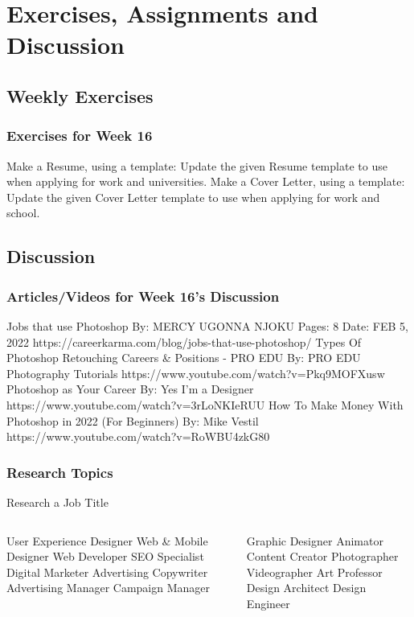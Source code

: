 \documentclass{beamer}
\begin{document}
\section{Exercises, Assignments and Discussion}

\subsection{Weekly Exercises}		
\begin{frame}
	\frametitle{Exercises for Week 16}
	\begin{outline}
		\1 Make a Resume, using a template:
		\2 Update the given Resume template to use when applying for work and universities.
		\1 Make a Cover Letter, using a template:
		\2 Update the given Cover Letter template to use when applying for work and school.
	\end{outline}
\end{frame}

\subsection{Discussion}		
\begin{frame}
	\frametitle{Articles/Videos for Week 16's Discussion}
	\begin{outline}
		\1 Jobs that use Photoshop
		\2  By:    MERCY UGONNA NJOKU
		\2  Pages: 8
		\2  Date:  FEB 5, 2022
		\2 https://careerkarma.com/blog/jobs-that-use-photoshop/
		 Types Of Photoshop Retouching Careers \& Positions - PRO EDU
		\2  By:  PRO EDU Photography Tutorials
		\2 https://www.youtube.com/watch?v=Pkq9MOFXusw
		\1 Photoshop as Your Career
		\2  By:  Yes I'm a Designer
		\2 https://www.youtube.com/watch?v=3rLoNKIeRUU
		\1 How To Make Money With Photoshop in 2022 (For Beginners)
		\2  By:  Mike Vestil
		\2 https://www.youtube.com/watch?v=RoWBU4zkG80
	\end{outline}
\end{frame}

\begin{frame}
	\frametitle{Research Topics}
	\begin{center}
		Research a Job Title
	\end{center}
	\begin{columns}
		\column{.5\textwidth}
		\begin{outline}
			\1 User Experience Designer
			\1 Web \& Mobile Designer
			\1 Web Developer
			\1 SEO Specialist
			\1 Digital Marketer
			\1 Advertising Copywriter
			\1 Advertising Manager
			\1 Campaign Manager
		\end{outline}
		\begin{outline}
			\1 Graphic Designer
			\1 Animator
			\1 Content Creator
			\1 Photographer
			\1 Videographer
			\1 Art Professor
			\1 Design Architect
			\1 Design Engineer
		\end{outline}
	\end{columns}
\end{frame}
	
			
\end{document}
